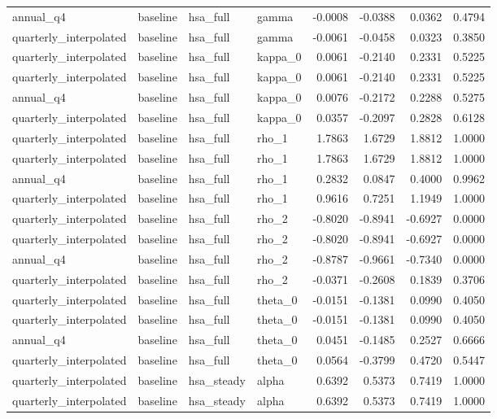 \begin{tabular}{llllrrrr}
annual\_q4 & baseline & hsa\_full & gamma & -0.0008 & -0.0388 & 0.0362 & 0.4794 \\
quarterly\_interpolated & baseline & hsa\_full & gamma & -0.0061 & -0.0458 & 0.0323 & 0.3850 \\
quarterly\_interpolated & baseline & hsa\_full & kappa\_0 & 0.0061 & -0.2140 & 0.2331 & 0.5225 \\
quarterly\_interpolated & baseline & hsa\_full & kappa\_0 & 0.0061 & -0.2140 & 0.2331 & 0.5225 \\
annual\_q4 & baseline & hsa\_full & kappa\_0 & 0.0076 & -0.2172 & 0.2288 & 0.5275 \\
quarterly\_interpolated & baseline & hsa\_full & kappa\_0 & 0.0357 & -0.2097 & 0.2828 & 0.6128 \\
quarterly\_interpolated & baseline & hsa\_full & rho\_1 & 1.7863 & 1.6729 & 1.8812 & 1.0000 \\
quarterly\_interpolated & baseline & hsa\_full & rho\_1 & 1.7863 & 1.6729 & 1.8812 & 1.0000 \\
annual\_q4 & baseline & hsa\_full & rho\_1 & 0.2832 & 0.0847 & 0.4000 & 0.9962 \\
quarterly\_interpolated & baseline & hsa\_full & rho\_1 & 0.9616 & 0.7251 & 1.1949 & 1.0000 \\
quarterly\_interpolated & baseline & hsa\_full & rho\_2 & -0.8020 & -0.8941 & -0.6927 & 0.0000 \\
quarterly\_interpolated & baseline & hsa\_full & rho\_2 & -0.8020 & -0.8941 & -0.6927 & 0.0000 \\
annual\_q4 & baseline & hsa\_full & rho\_2 & -0.8787 & -0.9661 & -0.7340 & 0.0000 \\
quarterly\_interpolated & baseline & hsa\_full & rho\_2 & -0.0371 & -0.2608 & 0.1839 & 0.3706 \\
quarterly\_interpolated & baseline & hsa\_full & theta\_0 & -0.0151 & -0.1381 & 0.0990 & 0.4050 \\
quarterly\_interpolated & baseline & hsa\_full & theta\_0 & -0.0151 & -0.1381 & 0.0990 & 0.4050 \\
annual\_q4 & baseline & hsa\_full & theta\_0 & 0.0451 & -0.1485 & 0.2527 & 0.6666 \\
quarterly\_interpolated & baseline & hsa\_full & theta\_0 & 0.0564 & -0.3799 & 0.4720 & 0.5447 \\
quarterly\_interpolated & baseline & hsa\_steady & alpha & 0.6392 & 0.5373 & 0.7419 & 1.0000 \\
quarterly\_interpolated & baseline & hsa\_steady & alpha & 0.6392 & 0.5373 & 0.7419 & 1.0000 \\

\end{tabular}
